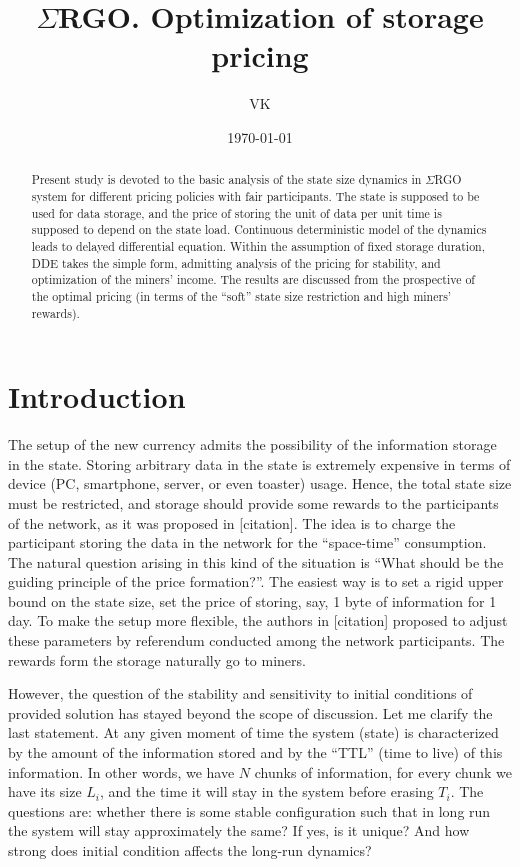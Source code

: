 \documentclass[preprint]{revtex4-1}
\begin{document}
\title{$\Sigma$RGO. Optimization of storage pricing} 

\author{VK}

\date{\today}

\begin{abstract}
    Present study is devoted to the basic analysis of the state size dynamics in
    $\Sigma$RGO system for different pricing policies with fair participants.
    The state is supposed to be used for data storage, and the price of storing
    the unit of data per unit time is supposed to depend on the state load.
    Continuous deterministic model of the dynamics leads to delayed differential
    equation.  Within the assumption of fixed storage duration, DDE takes the
    simple form, admitting analysis of the pricing for stability, and
    optimization of the miners' income. The results are discussed from the
    prospective of the optimal pricing (in terms of the ``soft'' state size
    restriction and high miners' rewards).
\end{abstract}

\maketitle

\section{Introduction}

The setup of the new currency admits the possibility of the information storage
in the state. Storing arbitrary data in the state is extremely expensive in
terms of device (PC, smartphone, server, or even toaster) usage. Hence, the
total state size must be restricted, and storage should provide some rewards to
the participants of the network, as it was proposed in [citation]. The idea is
to charge the participant storing the data in the network for the ``space-time''
consumption. The natural question arising in this kind of the situation is
``What should be the guiding principle of the price formation?''. The easiest
way is to set a rigid upper bound on the state size, set the price of storing,
say, 1 byte of information for 1 day. To make the setup more flexible, the
authors in [citation] proposed to adjust these parameters by referendum
conducted among the network participants. The rewards form the storage naturally
go to miners.

However, the question of the stability and sensitivity to initial conditions of
provided solution has stayed beyond the scope of discussion. Let me clarify the
last statement. At any given moment of time the system (state) is characterized
by the amount of the information stored and by the ``TTL'' (time to live) of
this information.  In other words, we have $N$ chunks of information, for every
chunk we have its size $L_i$, and the time it will stay in the system before
erasing $T_i$. The questions are: whether there is some stable configuration
such that in long run the system will stay approximately the same? If yes, is it
unique? And how strong does initial condition affects the long-run dynamics?
\end{document}
